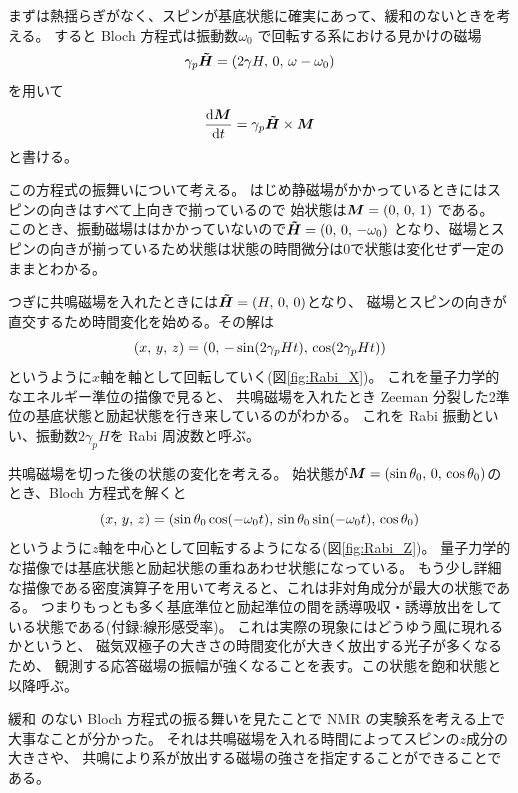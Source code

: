 \documentclass[11pt,dvipdfmx,a4paper]{jsarticle}
\begin{document}
まずは熱揺らぎがなく、スピンが基底状態に確実にあって、緩和のないときを考える。
すると Bloch 方程式は振動数\(\omega_0\)
で回転する系における見かけの磁場
\begin{equation}
	\gamma_p \vb*{\tilde{H}} = \qty(2\gamma H,\,0,\,\omega-\omega_0)
\end{equation}
を用いて
\begin{equation}
	\dv{\vb*{M}}{t} = \gamma_p \vb*{\tilde{H}} \times \vb*{M}
\end{equation}
と書ける。

この方程式の振舞いについて考える。
はじめ静磁場がかかっているときにはスピンの向きはすべて上向きで揃っているので
始状態は\(\vb*{M}=(0,\,0,\,1)\)
である。
このとき、振動磁場ははかかっていないので\(\vb*{\tilde{H}}=(0,\,0,\,-\omega_0)\)
となり、磁場とスピンの向きが揃っているため状態は状態の時間微分は0で状態は変化せず一定のままとわかる。

つぎに共鳴磁場を入れたときには\(\vb*{\tilde{H}}=(H,\,0,\,0)\)となり、
磁場とスピンの向きが直交するため時間変化を始める。その解は
\begin{equation}
	(x,\,y,\,z) = \qty(0,\,-\sin(2\gamma_p Ht),\,\cos(2\gamma_p Ht))
\end{equation}
というように\(x\)軸を軸として回転していく(図\ref{fig:Rabi_X})。
これを量子力学的なエネルギー準位の描像で見ると、
共鳴磁場を入れたとき Zeeman 分裂した2準位の基底状態と励起状態を行き来しているのがわかる。
これを Rabi 振動といい、振動数\(2\gamma_p H\)を Rabi 周波数と呼ぶ。

共鳴磁場を切った後の状態の変化を考える。
始状態が\(\vb*{M}=(\sin\theta_0,\,0,\,\cos\theta_0)\)のとき、Bloch 方程式を解くと
\begin{equation}
	(x,\,y,\,z) =
	\qty(\sin\theta_0\cos(-\omega_0 t),\,
	\sin\theta_0\sin(-\omega_0 t),\,\cos\theta_0)
\end{equation}
というように\(z\)軸を中心として回転するようになる(図\ref{fig:Rabi_Z})。
量子力学的な描像では基底状態と励起状態の重ねあわせ状態になっている。
もう少し詳細な描像である密度演算子を用いて考えると、これは非対角成分が最大の状態である。
つまりもっとも多く基底準位と励起準位の間を誘導吸収・誘導放出をしている状態である(付録:線形感受率)。
これは実際の現象にはどうゆう風に現れるかというと、
磁気双極子の大きさの時間変化が大きく放出する光子が多くなるため、
観測する応答磁場の振幅が強くなることを表す。この状態を飽和状態と以降呼ぶ。

緩和 のない Bloch 方程式の振る舞いを見たことで NMR の実験系を考える上で大事なことが分かった。
それは共鳴磁場を入れる時間によってスピンの\(z\)成分の大きさや、
共鳴により系が放出する磁場の強さを指定することができることである。
\end{document}
